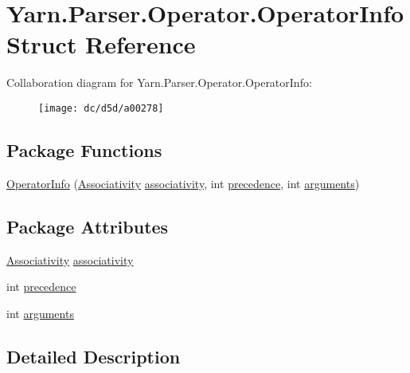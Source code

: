 \hypertarget{a00059}{\section{Yarn.\-Parser.\-Operator.\-Operator\-Info Struct Reference}
\label{a00059}
}


Collaboration diagram for Yarn.\-Parser.\-Operator.\-Operator\-Info\-:
\nopagebreak
\begin{figure}[H]
\begin{center}
\leavevmode
\texttt{[image: dc/d5d/a00278]}
\end{center}
\end{figure}
\subsection*{Package Functions}
\begin{DoxyCompactItemize}
\item 
\hyperlink{a00059_a25faca62235c9f8542e4a071ba8ebc0b}{Operator\-Info} (\hyperlink{a00058_a83fa1b8db0e6678006920812b6f33f62}{Associativity} \hyperlink{a00059_accba40a72d9709ca3c18810b8661afe3}{associativity}, int \hyperlink{a00059_a0b2921d7b863e268d33aa15213395093}{precedence}, int \hyperlink{a00059_a0758c6f7dac4b205f616b43b1af95b95}{arguments})
\end{DoxyCompactItemize}
\subsection*{Package Attributes}
\begin{DoxyCompactItemize}
\item 
\hyperlink{a00058_a83fa1b8db0e6678006920812b6f33f62}{Associativity} \hyperlink{a00059_accba40a72d9709ca3c18810b8661afe3}{associativity}
\item 
int \hyperlink{a00059_a0b2921d7b863e268d33aa15213395093}{precedence}
\item 
int \hyperlink{a00059_a0758c6f7dac4b205f616b43b1af95b95}{arguments}
\end{DoxyCompactItemize}


\subsection{Detailed Description}


